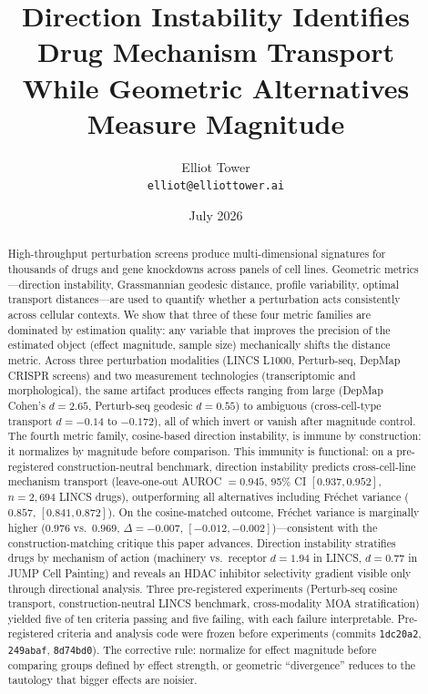 \documentclass[11pt]{article}
\title{Direction Instability Identifies Drug Mechanism Transport\\
While Geometric Alternatives Measure Magnitude}
\author{Elliot Tower\\
\texttt{elliot@elliottower.ai}}
\date{July 2026}
\begin{document}
\maketitle

\begin{abstract}
High-throughput perturbation screens produce multi-dimensional signatures
for thousands of drugs and gene knockdowns across panels of cell lines.
Geometric metrics---direction instability, Grassmannian geodesic
distance, profile variability, optimal transport distances---are used to
quantify whether a perturbation acts consistently across cellular
contexts. We show that three of these four metric families are dominated
by estimation quality: any variable that improves the precision of the
estimated object (effect magnitude, sample size) mechanically shifts the
distance metric. Across three perturbation modalities (LINCS L1000,
Perturb-seq, DepMap CRISPR screens) and two measurement technologies
(transcriptomic and morphological), the same artifact produces effects ranging from large (DepMap Cohen's
$d = 2.65$, Perturb-seq geodesic $d = 0.55$) to ambiguous
(cross-cell-type transport $d = -0.14$ to $-0.172$), all of which
invert or vanish after magnitude control. The fourth metric family,
cosine-based direction instability, is immune by construction: it
normalizes by magnitude before comparison. This immunity is functional:
on a pre-registered construction-neutral benchmark, direction instability
predicts cross-cell-line mechanism transport (leave-one-out AUROC $=
0.945$, 95\% CI $[0.937, 0.952]$, $n = 2{,}694$ LINCS drugs),
outperforming all alternatives including Fr\'{e}chet variance ($0.857$,
$[0.841, 0.872]$). On the cosine-matched outcome, Fr\'{e}chet variance
is marginally higher ($0.976$ vs.\ $0.969$, $\Delta = -0.007$, $[-0.012,
-0.002]$)---consistent with the construction-matching critique this paper
advances. Direction instability stratifies drugs by mechanism of action
(machinery vs.\ receptor $d = 1.94$ in LINCS, $d = 0.77$ in JUMP Cell
Painting) and reveals an HDAC inhibitor selectivity gradient visible
only through directional analysis. Three pre-registered experiments
(Perturb-seq cosine transport, construction-neutral LINCS benchmark,
cross-modality MOA stratification) yielded five of ten criteria passing
and five failing, with each failure interpretable. Pre-registered
criteria and analysis code were frozen before experiments (commits
\texttt{1dc20a2}, \texttt{249abaf}, \texttt{8d74bd0}). The corrective
rule: normalize for effect magnitude before comparing groups defined by
effect strength, or geometric ``divergence'' reduces to the tautology
that bigger effects are noisier.
\end{abstract}
\end{document}
